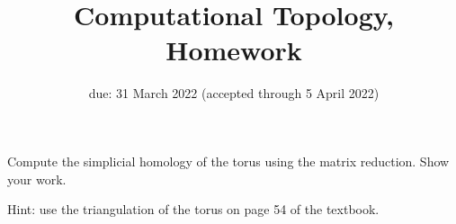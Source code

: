\documentclass{article}
\title{Computational Topology, Homework \hwnum}
\author{\todo{your name here}}
\date{due: 31 March 2022 (accepted through 5 April 2022)}
\begin{document}
\maketitle




Compute the simplicial homology of the torus using the matrix reduction.  Show your work.

Hint: use the triangulation of the torus on page 54 of the textbook.
\end{document}
